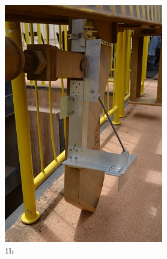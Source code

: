 \begin{figure}[h!]
  \centering
  \includegraphics[width=1\linewidth]{Fotos/Novembro2014/2.jpg}
  \caption{1b}
  \label{nov20132}
\end{figure}

